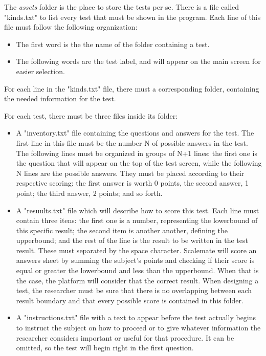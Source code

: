 \documentclass[12pt, a4paper, twoside]{article}
\begin{document}
The \textit{assets} folder is the place to store the tests per se. There is a file called "kinds.txt" to list every test that must be shown in the program. Each line of this file must follow the following organization:
\begin{itemize}
\item The first word is the the name of the folder containing a test.
\item The following words are the test label, and will appear on the main screen for easier selection.
\end{itemize}
For each line in the "kinds.txt" file, there must a corresponding folder, containing the needed information for the test.

For each test, there must be three files inside its folder:

\begin{itemize}
\item A "inventory.txt" file containing the questions and answers for the test. The first line in this file must be the number N of possible answers in the test. The following lines must be organized in groups of N+1 lines: the first one is the question that will appear on the top of the test screen, while the following N lines are the possible answers. They must be placed according to their respective scoring: the first answer is worth 0 points, the second answer, 1 point; the third answer, 2 points; and so forth.
\item A "resuults.txt" file which will describe how to score this test. Each line must contain three itens: the first one is a number, representing the lowerbound of this specific result; the second item is another another, defining the upperbound; and the rest of the line is the result to be written in the test result. These must separated by the space character. Scalemate will score an answers sheet by summing the subject's points and checking if their score is equal or greater the lowerbound and less than the upperbound. When that is the case, the platform will consider that the correct result. When designing a test, the researcher must be sure that there is no overlapping between each result boundary and that every possible score is contained in this folder.
\item A "instructions.txt" file with a text to appear before the test actually begins to instruct the subject on how to proceed or to give whatever information the researcher considers important or useful for that procedure. It can be omitted, so the test will begin right in the first question.
\end{itemize}
\end{document}
